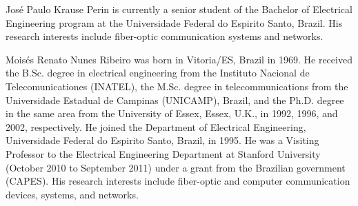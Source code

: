 \documentclass[journal]{IEEEtran}
\begin{document}
\begin{IEEEbiographynophoto}{José Paulo Krause Perin}
is currently a senior student of the Bachelor of Electrical Engineering program at the Universidade Federal do Espirito Santo, Brazil. His research interests include fiber-optic communication systems and networks.
\end{IEEEbiographynophoto}
\begin{IEEEbiographynophoto}{Moisés Renato Nunes Ribeiro}
was born in Vitoria/ES, Brazil in 1969. He received the B.Sc. degree in electrical engineering from the Instituto Nacional de Telecomunicationes (INATEL), the M.Sc. degree in telecommunications from the Universidade Estadual de Campinas (UNICAMP), Brazil, and the Ph.D. degree in the same area from the University
of Essex, Essex, U.K., in 1992, 1996, and 2002, respectively.
He joined the Department of Electrical Engineering, Universidade Federal do Espirito Santo, Brazil, in 1995. He was a Visiting Professor to the Electrical Engineering Department at Stanford University (October 2010 to September 2011) under a grant from the Brazilian government (CAPES). His research interests include fiber-optic and computer communication devices, systems, and networks.
\end{IEEEbiographynophoto}
\end{document}
